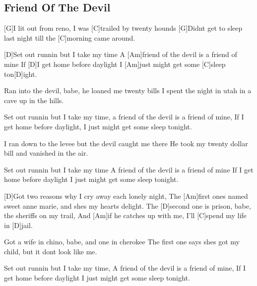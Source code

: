 \subsection*{Friend Of The Devil   }



\begin{guitar}


[G]I lit out from reno, I was [C]trailed by twenty hounds
[G]Didnt get to sleep last night till the [C]morning came around.


[D]Set out runnin but I take my time
A [Am]friend of the devil is a friend of mine
If [D]I get home before daylight
I [Am]just might get some [C]sleep ton[D]ight.


Ran into the devil, babe, he loaned me twenty bills
I spent the night in utah in a cave up in the hills.

Set out runnin but I take my time, a friend of the devil is a friend of mine,
If I get home before daylight, I just might get some sleep tonight.

I ran down to the levee but the devil caught me there
He took my twenty dollar bill and vanished in the air.

Set out runnin but I take my time
A friend of the devil is a friend of mine
If I get home before daylight
I just might get some sleep tonight.


[D]Got two reasons why I cry away each lonely night,
The [Am]first ones named sweet anne marie, and shes my hearts delight.
The [D]second one is prison, babe, the sheriffs on my trail,
And [Am]if he catches up with me, I'll [C]spend my life in [D]jail.


Got a wife in chino, babe, and one in cherokee
The first one says shes got my child, but it dont look like me.

Set out runnin but I take my time,
A friend of the devil is a friend of mine,
If I get home before daylight
I just might get some sleep tonight.
\end{guitar}

